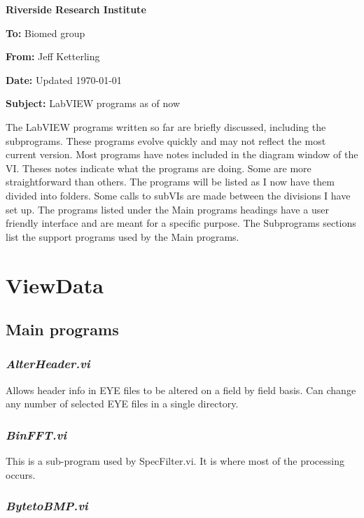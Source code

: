 \documentclass[10pt]{article}
\begin{document}
\begin{center}
 {\huge \bf Riverside Research Institute}
\end{center}

{\bf To:} Biomed group

{\bf From:} Jeff Ketterling

{\bf Date:} Updated \today

{\bf Subject:} LabVIEW programs as of now
 \vspace{0.5 cm}

The LabVIEW programs written so far are briefly discussed,
including the subprograms. These programs evolve quickly and may
not reflect the most current version. Most programs have notes
included in the diagram window of the VI. Theses notes indicate
what the programs are doing. Some are more straightforward than
others. The programs will be listed as I now have them divided
into folders. Some calls to subVIs are made between the divisions
I have set up. The programs listed under the Main programs
headings have a user friendly interface and are meant for a
specific purpose. The Subprograms sections list the support
programs used by the Main programs.

\vspace{0.5 cm}
 \hline
\vspace{0.5 cm}

\section{ViewData}
\subsection{Main programs}
\subsubsection{{\it AlterHeader.vi}}

Allows header info in EYE files to be altered on a field by field
basis. Can change any number of selected EYE files in a single
directory.

\subsubsection{{\it BinFFT.vi}}

This is a sub-program used by SpecFilter.vi. It is where most of
the processing occurs.

\subsubsection{{\it BytetoBMP.vi}}
\end{document}
